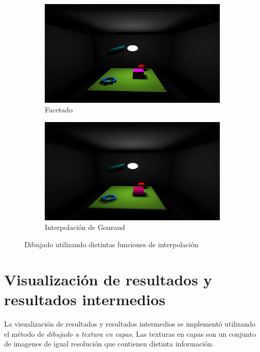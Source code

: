 \begin{figure}[H]
	\centering
	\begin{subfigure}{0.7\textwidth}
		\centering
		\includegraphics[width=1\linewidth]{assets/cornell-flat}
		\caption{Facetado}
	\end{subfigure}
	\begin{subfigure}{0.7\textwidth}
		\centering
		\includegraphics[width=1\linewidth]{assets/cornell-gouraud}
		\caption{Interpolación de Gouraud}
	\end{subfigure}
	\caption{Dibujado utilizando distintas funciones de interpolación}
	\label{img:interpolationres}
\end{figure}

\section {Visualización de resultados y resultados intermedios}

La visualización de resultados y resultados intermedios se implementó utilizando el método de \textit{dibujado a textura en capas}. Las texturas en capas son un conjunto de imagenes de igual resolución que contienen distinta información.

